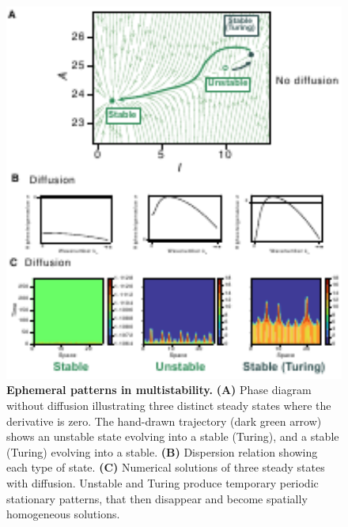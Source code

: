 \begin{figure}[H] %
    \centering
    \begin{adjustbox}{center}
        \includegraphics[width=1\textwidth]{chapters/Chapter 1/multistability2} %
    \end{adjustbox}
    \caption{\textbf{Ephemeral patterns in multistability.} \textbf{(A)} Phase diagram without diffusion illustrating three distinct steady states where the derivative is zero. The hand-drawn trajectory (dark green arrow) shows an unstable state evolving into a stable (Turing), and a stable (Turing) evolving into a stable. \textbf{(B)} Dispersion relation showing each type of state. \textbf{(C)} Numerical solutions of three steady states with diffusion. Unstable and Turing produce temporary periodic stationary patterns, that then disappear and become spatially homogeneous solutions.}
    \label{fig:multistability2} %
\end{figure}

